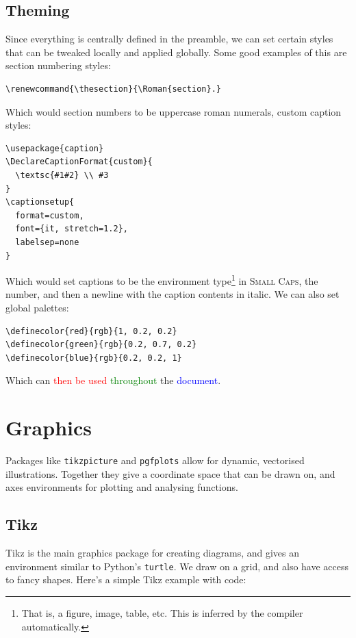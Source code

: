 \documentclass[12pt]{article}
\begin{document}
\subsection{Theming}

Since everything is centrally defined in the preamble, we can set certain styles that can be tweaked locally and applied globally. Some good examples of this are section numbering styles:
\begin{verbatim}
\renewcommand{\thesection}{\Roman{section}.}
\end{verbatim}
Which would section numbers to be uppercase roman numerals,
custom caption styles:
\begin{verbatim}
\usepackage{caption}
\DeclareCaptionFormat{custom}{ 
  \textsc{#1#2} \\ #3 
}
\captionsetup{
  format=custom,
  font={it, stretch=1.2},
  labelsep=none
}
\end{verbatim}
Which would set captions to be the environment type\footnote{That is, a figure, image, table, etc. This is inferred by the compiler automatically.} in \textsc{Small Caps}, the number, and then a newline with the caption contents in italic. We can also set global palettes:
\begin{verbatim}
\definecolor{red}{rgb}{1, 0.2, 0.2}
\definecolor{green}{rgb}{0.2, 0.7, 0.2}
\definecolor{blue}{rgb}{0.2, 0.2, 1}
\end{verbatim}
Which can \textcolor{red}{then be used} \textcolor{green}{throughout} the \textcolor{blue}{document}.


\section{Graphics}
Packages like \texttt{tikzpicture} and \texttt{pgfplots} allow for dynamic, vectorised illustrations. Together they give a coordinate space that can be drawn on, and axes environments for plotting and analysing functions.

\subsection{Tikz}

Tikz is the main graphics package for creating diagrams, and gives an environment similar to Python's \texttt{turtle}. We draw on a grid, and also have access to fancy shapes.
Here's a simple Tikz example with code:
\end{document}
